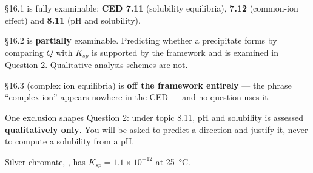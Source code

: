 \documentclass{apchem-exam}
\begin{document}
\apctitleblock

\begin{apcnote}
\S16.1 is fully examinable: \textbf{CED 7.11} (solubility equilibria),
\textbf{7.12} (common-ion effect) and \textbf{8.11} (pH and solubility).

\S16.2 is \textbf{partially} examinable. Predicting whether a precipitate
forms by comparing $Q$ with $K_{sp}$ is supported by the framework and is
examined in Question 2. Qualitative-analysis schemes are not.

\S16.3 (complex ion equilibria) is \textbf{off the framework entirely} ---
the phrase ``complex ion'' appears nowhere in the CED --- and no question
uses it.

One exclusion shapes Question 2: under topic 8.11, pH and solubility is
assessed \textbf{qualitatively only}. You will be asked to predict a
direction and justify it, never to compute a solubility from a pH.
\end{apcnote}



Silver chromate, , has $K_{sp} = 1.1\times10^{-12}$ at
\SI{25}{\celsius}.
\end{document}
